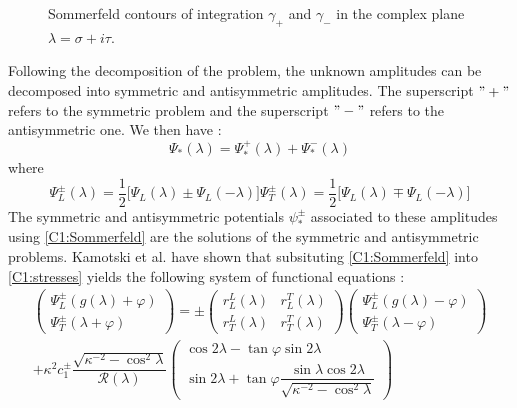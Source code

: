 \begin{figure}
\caption{Sommerfeld contours of integration $\gamma_+$ and $\gamma_-$ in the complex plane $\lambda=\sigma+i\tau$.}
\label{C1:Somcontours}
\end{figure}

Following the decomposition of the problem, the unknown amplitudes can be decomposed into symmetric and antisymmetric amplitudes. The superscript $"+"$ refers to the symmetric problem and the superscript $"-"$ refers to the antisymmetric one. We then have :
\begin{equation}
\Psi_*(\lambda)=\Psi_*^+(\lambda)+\Psi_*^-(\lambda)
\end{equation}
where
\begin{subequations}
\begin{equation}
\Psi_L^\pm(\lambda)=\frac{1}{2}\lbrack\Psi_L(\lambda)\pm\Psi_L(-\lambda)\rbrack
\end{equation}
\begin{equation}
\Psi_T^\pm(\lambda)=\frac{1}{2}\lbrack\Psi_L(\lambda)\mp\Psi_L(-\lambda)\rbrack
\end{equation}
\end{subequations}
The symmetric and antisymmetric potentials $\psi_*^\pm$ associated to these amplitudes using \eqref{C1:Sommerfeld} are the solutions of the symmetric and antisymmetric problems. Kamotski et al. \cite{KamotskiFradkin} have shown that subsituting \eqref{C1:Sommerfeld} into \eqref{C1:stresses} yields the following system of functional equations :
\begin{multline}
\begin{pmatrix}
\Psi_L^\pm(g(\lambda)+\varphi)\\
\Psi_T^\pm(\lambda+\varphi)
\end{pmatrix}
=\pm\begin{pmatrix}
r_L^L(\lambda)&r_L^T(\lambda)\\
r_T^L(\lambda)&r_T^T(\lambda)
\end{pmatrix} 
\begin{pmatrix}
\Psi_L^\pm(g(\lambda)-\varphi)\\
\Psi_T^\pm(\lambda-\varphi)
\end{pmatrix} \\
+\kappa^2 c_1^\pm\dfrac{\sqrt{\kappa^{-2}-\cos^2\lambda}}{\mathcal{R}(\lambda)} \begin{pmatrix}
\cos 2\lambda-\tan\varphi\sin 2\lambda \\
\sin 2\lambda+\tan\varphi\dfrac{\sin\lambda\cos 2\lambda}{\sqrt{\kappa^{-2}-\cos^2\lambda}}
\end{pmatrix}
\label{C1:SIfunctional}
\end{multline}
